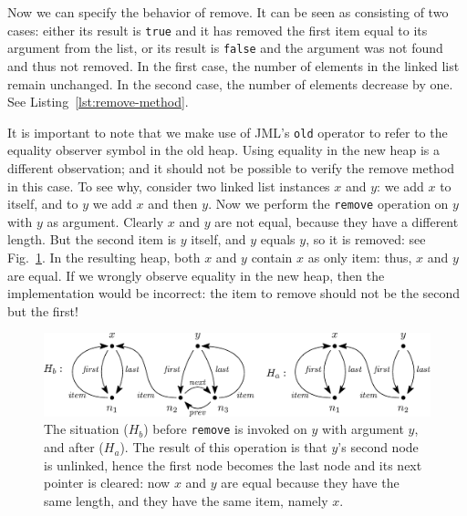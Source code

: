 \documentclass[runningheads]{llncs}
\def\bs{\char092}
\begin{document}
Now we can specify the behavior of remove. It can be seen as consisting of two cases: either its result is \texttt{true} and it has removed the first item equal to its argument from the list, or its result is \texttt{false} and the argument was not found and thus not removed. In the first case, the number of elements in the linked list remain unchanged. In the second case, the number of elements decrease by one. See Listing~\ref{lst:remove-method}.



It is important to note that we make use of JML's \texttt{\bs old} operator to refer to the equality observer symbol in the old heap. Using equality in the new heap is a different observation; and it should not be possible to verify the remove method in this case. To see why, consider two linked list instances $x$ and $y$: we add $x$ to itself, and to $y$ we add $x$ and then $y$. Now we perform the \texttt{remove} operation on $y$ with $y$ as argument. Clearly $x$ and $y$ are not equal, because they have a different length. But the second item is $y$ itself, and $y$ equals $y$, so it is removed: see Fig.~\ref{fig:remove-equals}. In the resulting heap, both $x$ and $y$ contain $x$ as only item: thus, $x$ and $y$ are equal. If we wrongly observe equality in the new heap, then the implementation would be incorrect: the item to remove should not be the second but the first!

\begin{figure}
   \centering
   \includegraphics[scale=0.5]{figures/linkedlist-remove-equals.eps}
   \caption{The situation ($H_b$) before \texttt{remove} is invoked on $y$ with argument $y$, and after ($H_a$). The result of this operation is that $y$'s second node is unlinked, hence the first node becomes the last node and its next pointer is cleared: now $x$ and $y$ are equal because they have the same length, and they have the same item, namely $x$.}
   \vspace*{-12pt}
   \label{fig:remove-equals}
\end{figure}
\end{document}
